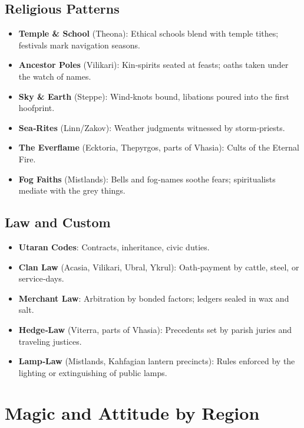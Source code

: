 \subsection*{Religious Patterns}
\begin{itemize}
\item \textbf{Temple \& School} (Theona): Ethical schools blend with temple tithes; festivals mark navigation seasons.
\item \textbf{Ancestor Poles} (Vilikari): Kin‑spirits seated at feasts; oaths taken under the watch of names.
\item \textbf{Sky \& Earth} (Steppe): Wind‑knots bound, libations poured into the first hoofprint.
\item \textbf{Sea‑Rites} (Linn/Zakov): Weather judgments witnessed by storm‑priests.
\item \textbf{The Everflame} (Ecktoria, Thepyrgos, parts of Vhasia): Cults of the Eternal Fire.
\item \textbf{Fog Faiths} (Mistlands): Bells and fog‑names soothe fears; spiritualists mediate with the grey things.
\end{itemize}

\subsection*{Law and Custom}
\begin{itemize}
\item \textbf{Utaran Codes}: Contracts, inheritance, civic duties.
\item \textbf{Clan Law} (Acasia, Vilikari, Ubral, Ykrul): Oath‑payment by cattle, steel, or service‑days.
\item \textbf{Merchant Law}: Arbitration by bonded factors; ledgers sealed in wax and salt.
\item \textbf{Hedge‑Law} (Viterra, parts of Vhasia): Precedents set by parish juries and traveling justices.
\item \textbf{Lamp‑Law} (Mistlands, Kahfagian lantern precincts): Rules enforced by the lighting or extinguishing of public lamps.
\end{itemize}

\section{Magic and Attitude by Region}
\label{sec:magic-attitudes}

